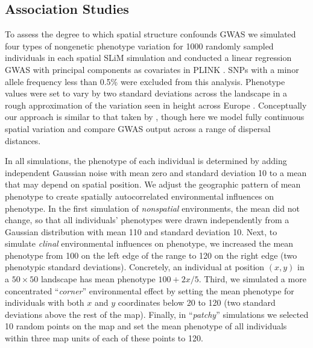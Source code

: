 \documentclass[10pt,twoside,lineno,hidelinks]{preprint}
\begin{document}

\subsection{Association Studies}

To assess the degree to which spatial structure confounds GWAS we simulated four types of nongenetic phenotype variation for 1000 randomly sampled individuals in each spatial SLiM simulation and conducted a linear regression GWAS with principal components as covariates in PLINK \citep{PURCELL2007}. SNPs with a minor allele frequency less than 0.5\% were excluded from this analysis. Phenotype values were set to vary by two standard deviations across the landscape in a rough approximation of the variation seen in height across Europe \citep{Turchin2012,garcia2006,garcia2007}. Conceptually our approach is similar to that taken by \citet{Mathieson2012}, though here we model fully continuous spatial variation and compare GWAS output across a range of dispersal distances. 

In all simulations, the phenotype of each individual
is determined by adding independent Gaussian noise with mean zero and standard deviation 10 
to a mean that may depend on spatial position.
We adjust the geographic pattern of mean phenotype to create spatially autocorrelated environmental influences on phenotype.
In the first simulation of \emph{nonspatial} environments, the mean did not change,
so that all individuals' phenotypes were drawn independently from a Gaussian distribution with mean 110 and standard deviation 10.
Next, to simulate \emph{clinal} environmental influences on phenotype, 
we increased the mean phenotype from 100 on the left edge of the range to 120 on the right edge (two phenotypic standard deviations).
Concretely, an individual at position $(x,y)$ in a $50 \times 50$ landscape has mean phenotype $100 + 2x / 5$.
Third, we simulated a more concentrated ``\emph{corner}'' environmental effect by setting the mean phenotype 
for individuals with both $x$ and $y$ coordinates below 20 to 120 (two standard deviations above the rest of the map). 
Finally, in ``\emph{patchy}'' simulations we selected 10 random points on the map
and set the mean phenotype of all individuals within three map units of each of these points
to 120.
\end{document}

